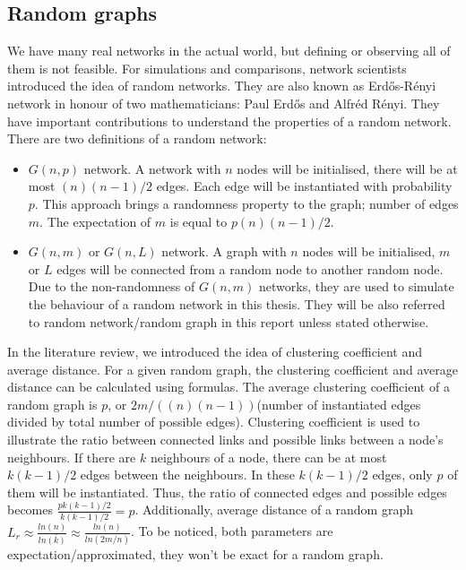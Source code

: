 \documentclass[12pt]{article}
\begin{document}
\subsection{Random graphs}
We have many real networks in the actual world, but defining or observing all of them is not feasible. For simulations and comparisons, network scientists introduced the idea of random networks. They are also known as Erd\H{o}s-R\'{e}nyi network in honour of two mathematicians: Paul Erd\H{o}s and Alfr\'{e}d R\'{e}nyi. They have important contributions to understand the properties of a random network\cite{renyi1959random}.\\
\noindent
There are two definitions of a random network:
\begin{itemize}
    \item $G(n,p)$ network. A network with $n$ nodes will be initialised, there will be at most $(n)(n-1)/2$ edges. Each edge will be instantiated with probability $p$. This approach brings a randomness property to the graph; number of edges $m$. The expectation of $m$ is equal to $p(n)(n-1)/2$.
    \item $G(n,m)$ or $G(n,L)$ network. A graph with $n$ nodes will be initialised, $m$ or $L$ edges will be connected from a random node to another random node. Due to the non-randomness of $G(n,m)$ networks, they are used to simulate the behaviour of a random network in this thesis. They will be also referred to random network/random graph in this report unless stated otherwise.
\end{itemize}

\noindent
In the literature review\cite{litreview}, we introduced the idea of clustering coefficient and average distance. For a given random graph, the clustering coefficient and average distance can be calculated using formulas.\cite{barabási2016network} The average clustering coefficient of a random graph is $p$, or $2m/((n)(n-1))$(number of instantiated edges divided by total number of possible edges). Clustering coefficient is used to illustrate the ratio between connected links and possible links between a node's neighbours. If there are $k$ neighbours of a node, there can be at most $k(k-1)/2$ edges between the neighbours. In these $k(k-1)/2$ edges, only $p$ of them will be instantiated. Thus, the ratio of connected edges and possible edges becomes $\frac{pk(k-1)/2}{k(k-1)/2}=p$. Additionally, average distance of a random graph $L_r \approx \frac{ln(n)}{ln\bar{(k)}}\approx \frac{ln(n)}{ln(2m/n)}$. To be noticed, both parameters are expectation/approximated, they won't be exact for a random graph.
\end{document}
